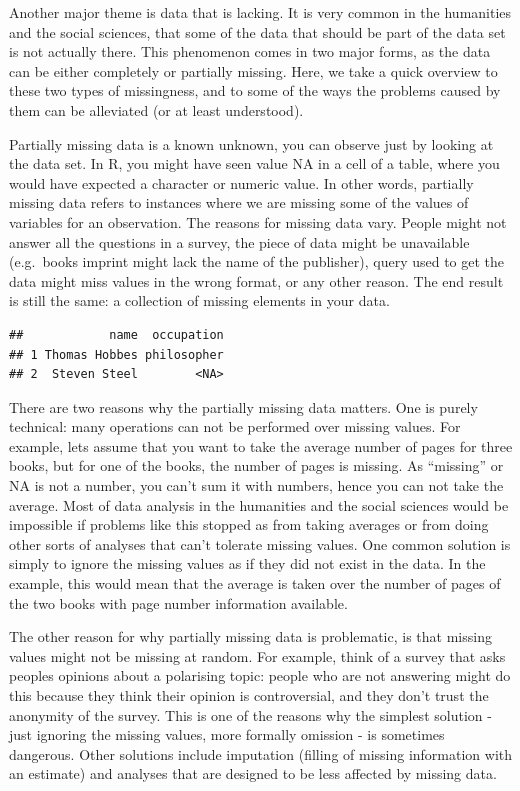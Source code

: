 \documentclass[
]{book}
\begin{document}
Another major theme is data that is lacking. It is very common in the humanities and the social sciences, that some of the data that should be part of the data set is not actually there. This phenomenon comes in two major forms, as
the data can be either completely or partially missing. Here, we take a quick overview to these two types of missingness, and to some of the ways the problems caused by them can be alleviated (or at least understood).

Partially missing data is a known unknown, you can observe just by looking at the data set. In R, you might have seen value NA in a cell of a table, where you would have expected a character or numeric value. In other words, partially missing data refers to instances where we are missing some of the values of variables for an observation. The reasons for missing data vary. People might not answer all the questions in a survey, the piece of data might be unavailable (e.g.~books imprint might lack
the name of the publisher), query used to get the data might miss values in the wrong format, or any other reason. The end result is still the same: a collection of missing elements in your data.

\begin{verbatim}
##            name  occupation
## 1 Thomas Hobbes philosopher
## 2  Steven Steel        <NA>
\end{verbatim}

There are two reasons why the partially missing data matters. One is purely technical: many operations can not be performed over missing values. For example, lets assume that you want to take the average number of pages for three books, but for one of the books, the number of pages is missing. As ``missing'' or NA is not a number, you can't sum it with numbers, hence you can not take
the average. Most of data analysis in the humanities and the social sciences would be impossible if problems like this stopped as from taking averages or from doing other sorts of analyses that can't tolerate missing values. One common solution is simply to ignore the missing values as if they did not exist in the data. In the example, this would mean that the average is taken over the number of pages of the two books with page number information available.

The other reason for why partially missing data is problematic, is that missing values might not be missing at random. For example, think of a survey that asks peoples opinions about a polarising topic: people who are not answering might do this because they think their opinion is controversial, and they don't trust the anonymity of the survey. This is one of the reasons why the simplest solution - just ignoring the missing values, more formally omission - is sometimes dangerous. Other solutions include imputation (filling of missing information with an estimate) and analyses that are designed to be less affected by missing data.
\end{document}
